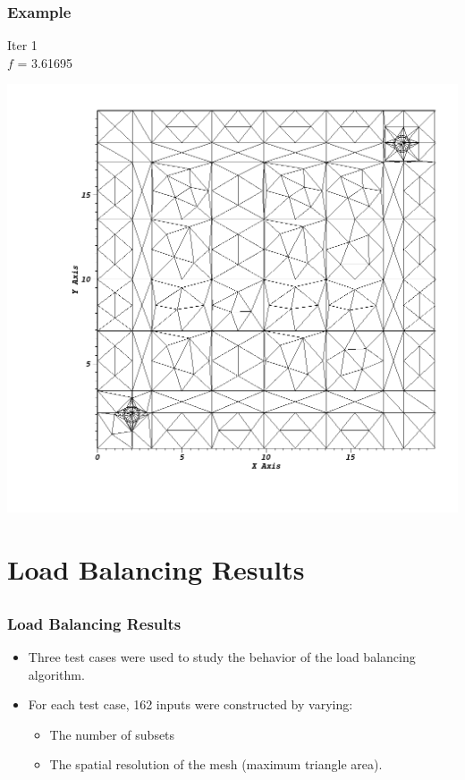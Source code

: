 \documentclass[]{beamer}
\begin{document}
\begin{frame}[t]\frametitle{Example}
\begin{minipage}{0.15\textwidth}
\begin{footnotesize}
Iter 1 \\
$f$ = 3.61695 
\end{footnotesize}
\end{minipage}
\begin{minipage}{0.8\textwidth}
\centering
\includegraphics[scale = 0.22]{figures/redistribute_after.png}
\end{minipage}
\end{frame}

\section{Load Balancing Results}
\subsection{}
\begin{frame}[t]\frametitle{Load Balancing Results}
\begin{block}{}
\begin{itemize}
	\item Three test cases were used to study the behavior of the load balancing algorithm.
	\item For each test case, 162 inputs were constructed by varying:
		\begin{itemize}
		\item The number of subsets
		\item The spatial resolution of the mesh (maximum triangle area).
		\end{itemize}
\end{itemize}
\end{block}
\end{frame}
\end{document}
